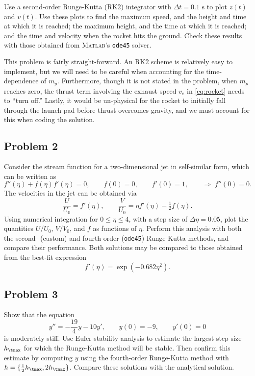 \documentclass[12pt]{article}
\begin{document}
Use a second-order Runge-Kutta (RK2) integrator with $\Delta t = 0.1 \text{ s}$ to plot $z(t)$ and $v(t)$. Use these plots to find the maximum speed, and the height and time at which it is reached; the maximum height, and the time at which it is reached; and the time and velocity when the rocket hits the ground. Check these results with those obtained from \textsc{Matlab}'s \lstinline|ode45| solver.

This problem is fairly straight-forward. An RK2 scheme is relatively easy to implement, but we will need to be careful when accounting for the time-dependence of $m_p$. Furthermore, though it is not stated in the problem, when $m_p$ reaches zero, the thrust term involving the exhaust speed $v_e$ in \eqref{eq:rocket} needs to ``turn off.'' Lastly, it would be un-physical for the rocket to initially fall through the launch pad before thrust overcomes gravity, and we must account for this when coding the solution.

\subsection{Problem 2}

Consider the stream function for a two-dimensional jet in self-similar form, which can be written as
\begin{equation}
f''(\eta) + f(\eta) f'(\eta) = 0 ,\qquad
f(0) = 0 ,\qquad
f'(0) = 1 ,\qquad
\Rightarrow \;
f''(0) = 0
.
\end{equation}
The velocities in the jet can be obtained via
\begin{equation}
\frac{U}{U_0} = f'(\eta) ,\qquad
\frac{V}{U_0} = \eta f'(\eta) - \tfrac{1}{2} f(\eta)
.
\end{equation}
Using numerical integration for $0 \le \eta \le 4$, with a step size of $\Delta \eta = 0.05$, plot the quantities $U/U_0$, $V/V_0$, and $f$ as functions of $\eta$. Perform this analysis with both the second- (custom) and fourth-order (\lstinline|ode45|) Runge-Kutta methods, and compare their performance. Both solutions may be compared to those obtained from the best-fit expression
\begin{equation}
f'(\eta) = \exp(-0.682 \eta^2)
.
\end{equation}

\subsection{Problem 3}

Show that the equation
\begin{equation}
y'' = -\frac{19}{4} y - 10 y' ,\qquad
y(0) = -9 ,\qquad
y'(0) = 0
\end{equation}
is moderately stiff. Use Euler stability analysis to estimate the largest step size $h_\tmax$ for which the Runge-Kutta method will be stable. Then confirm this estimate by computing $y$ using the fourth-order Runge-Kutta method with $h = \{ \tfrac{1}{2} h_\tmax, 2 h_\tmax\}$. Compare these solutions with the analytical solution.
\end{document}
